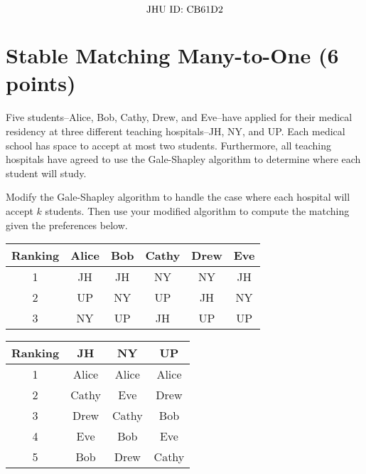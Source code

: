 \documentclass[11pt]{article}
\begin{document}
\newpage


\[\text{JHU ID:\@ CB61D2}\]

\section{Stable Matching Many-to-One (6 points)}

Five students--Alice, Bob, Cathy, Drew, and Eve--have applied for their medical residency at three different teaching hospitals--JH, NY, and UP.\@
Each medical school has space to accept at most two students.  Furthermore, all teaching hospitals have agreed to use the Gale-Shapley algorithm to determine where each student will study.

Modify the Gale-Shapley algorithm to handle the case where each hospital will accept $k$ students.  Then use your modified algorithm to compute the matching given the preferences below.

\vspace{5mm}
\noindent
\begin{minipage}{.5\textwidth}
\begin{tabular}{|c|ccccc|}
\hline
    Ranking & Alice & Bob & Cathy & Drew & Eve \\ \hline
    1 & JH & JH & NY & NY & JH \\
    2 & UP & NY & UP & JH & NY \\
    3 & NY & UP & JH & UP & UP \\ \hline
\end{tabular}
\end{minipage}\hfill
\begin{minipage}{.35\textwidth}
    \begin{tabular}{|c|ccc|}
\hline
    Ranking & JH & NY & UP \\ \hline
    1 & Alice & Alice & Alice \\
    2 & Cathy & Eve & Drew \\
    3 & Drew & Cathy & Bob \\
    4 & Eve & Bob & Eve \\
    5 & Bob & Drew & Cathy \\ \hline
\end{tabular}
\end{minipage}
\end{document}
